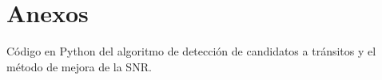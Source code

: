 \chapter*{\textbf{Anexos}}

Código en Python del algoritmo de detección de candidatos a tránsitos y el método de mejora de la SNR.

